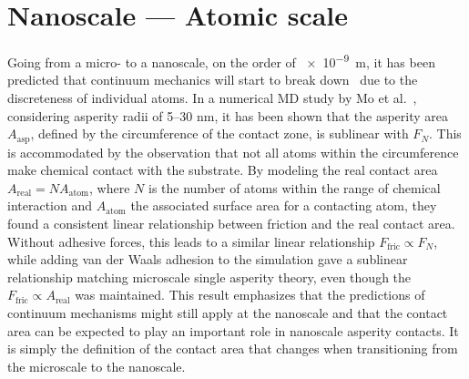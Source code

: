 









%
\section{Nanoscale --- Atomic scale}\label{sec:nanoscale}
Going from a micro- to a nanoscale, on the order of \SI{e-9}{m}, it has been
predicted that continuum mechanics will start to break down~\cite{luan_breakdown_2005} due to the discreteness of individual atoms. In a
numerical \acrshort{MD} study by Mo et al.~\cite{mo_friction_2009}, considering
asperity radii of 5--30 nm, it has been shown that the asperity area
$A_{\text{asp}}$, defined by the circumference of the contact zone, is
sublinear with $F_N$. This is accommodated by the observation that not all atoms
within the circumference make chemical contact with the substrate. By modeling
the real contact area $A_{\text{real}} = NA_{\text{atom}}$, where $N$ is the
number of atoms within the range of chemical interaction and $A_{\text{atom}}$
the associated surface area for a contacting atom, they found a consistent linear relationship between friction and the real contact area. Without adhesive
forces, this leads to a similar linear relationship $F_{\text{fric}} \propto F_N$,
while adding van der Waals adhesion to the simulation gave a sublinear
relationship matching microscale single asperity theory, even though the
$F_{\text{fric}} \propto A_{\text{real}}$ was maintained. This result emphasizes
that the predictions of continuum mechanisms might still apply at the nanoscale
and that the contact area can be expected to play an important role in
nanoscale asperity contacts. It is simply the definition of the contact area that
changes when transitioning from the microscale to the nanoscale.


